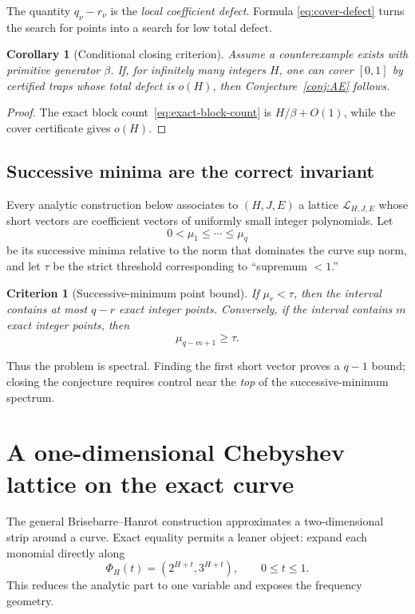 \documentclass[11pt,oneside]{article}
\newtheorem{corollary}[theorem]{Corollary}
\newtheorem{criterion}[theorem]{Criterion}
\theoremstyle{definition}
\theoremstyle{remark}
\newcommand{\cL}{\mathcal L}
\begin{document}
The quantity $q_\nu-r_\nu$ is the \emph{local coefficient defect}.  Formula
\eqref{eq:cover-defect} turns the search for points into a search for low total defect.

\begin{corollary}[Conditional closing criterion]
\label{cor:conditional-closing}
Assume a counterexample exists with primitive generator $\beta$.  If, for infinitely many
integers $H$, one can cover $[0,1]$ by certified traps whose total defect is
$o(H)$, then Conjecture~\ref{conj:AE} follows.
\end{corollary}

\begin{proof}
The exact block count~\eqref{eq:exact-block-count} is $H/\beta+O(1)$, while the cover
certificate gives $o(H)$.
\end{proof}

\subsection{Successive minima are the correct invariant}

Every analytic construction below associates to $(H,J,E)$ a lattice $\cL_{H,J,E}$ whose
short vectors are coefficient vectors of uniformly small integer polynomials.  Let
\[
 0<\mu_1\le\cdots\le\mu_q
\]
be its successive minima relative to the norm that dominates the curve sup norm, and let
$\tau$ be the strict threshold corresponding to ``supremum $<1$.''

\begin{criterion}[Successive-minimum point bound]
\label{crit:successive-minima}
If $\mu_r<\tau$, then the interval contains at most $q-r$ exact integer points.  Conversely,
if the interval contains $m$ exact integer points, then
\[
 \mu_{q-m+1}\ge\tau.
\]
\end{criterion}

Thus the problem is spectral.  Finding the first short vector proves a $q-1$ bound; closing the
conjecture requires control near the \emph{top} of the successive-minimum spectrum.

\section{A one-dimensional Chebyshev lattice on the exact curve}
\label{sec:cheb-lattice}

The general Brisebarre--Hanrot construction approximates a two-dimensional strip around a
curve.  Exact equality permits a leaner object: expand each monomial directly along
\[
 \Phi_H(t)=(2^{H+t},3^{H+t}),\qquad 0\le t\le1.
\]
This reduces the analytic part to one variable and exposes the frequency geometry.
\end{document}
